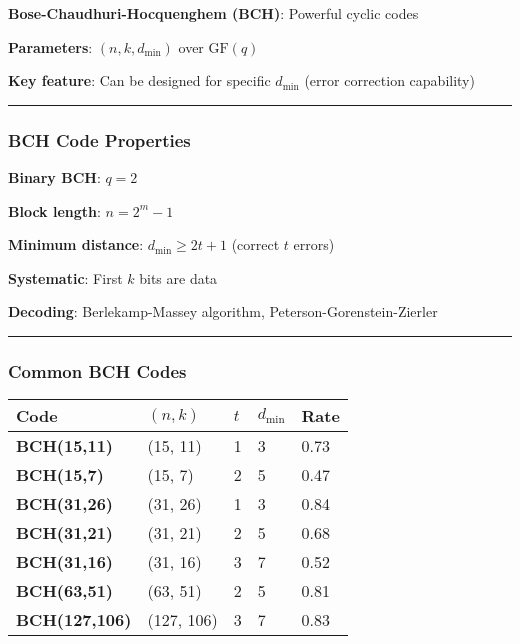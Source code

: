 \textbf{Bose-Chaudhuri-Hocquenghem (BCH)}: Powerful cyclic codes

\textbf{Parameters}: \((n, k, d_{\min})\) over \(\mathrm{GF}(q)\)

\textbf{Key feature}: Can be designed for specific \(d_{\min}\) (error
correction capability)

\begin{center}\rule{0.5\linewidth}{0.5pt}\end{center}

\subsubsection{BCH Code Properties}\label{bch-code-properties}

\textbf{Binary BCH}: \(q = 2\)

\textbf{Block length}: \(n = 2^m - 1\)

\textbf{Minimum distance}: \(d_{\min} \geq 2t + 1\) (correct \(t\)
errors)

\textbf{Systematic}: First \(k\) bits are data

\textbf{Decoding}: Berlekamp-Massey algorithm,
Peterson-Gorenstein-Zierler

\begin{center}\rule{0.5\linewidth}{0.5pt}\end{center}

\subsubsection{Common BCH Codes}\label{common-bch-codes}

{\def\LTcaptype{} %
\begin{longtable}[]{@{}lllll@{}}
\toprule\noalign{}
Code & \((n, k)\) & \(t\) & \(d_{\min}\) & Rate \\
\midrule\noalign{}
\endhead
\bottomrule\noalign{}
\endlastfoot
\textbf{BCH(15,11)} & (15, 11) & 1 & 3 & 0.73 \\
\textbf{BCH(15,7)} & (15, 7) & 2 & 5 & 0.47 \\
\textbf{BCH(31,26)} & (31, 26) & 1 & 3 & 0.84 \\
\textbf{BCH(31,21)} & (31, 21) & 2 & 5 & 0.68 \\
\textbf{BCH(31,16)} & (31, 16) & 3 & 7 & 0.52 \\
\textbf{BCH(63,51)} & (63, 51) & 2 & 5 & 0.81 \\
\textbf{BCH(127,106)} & (127, 106) & 3 & 7 & 0.83 \\
\end{longtable}
}

